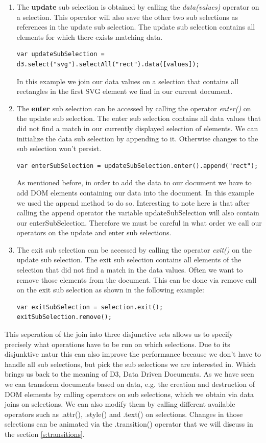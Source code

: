 \documentclass{bioinfo}
\begin{document}
\begin{enumerate}
\item The \textbf{update} sub selection is obtained by calling the \textit{data(values)} operator on a selection. This operator will also save the other two sub selections as references in the update sub selection.
The update sub selection contains all elements for which there exists matching data.
\begin{lstlisting}
var updateSubSelection = d3.select("svg").selectAll("rect").data([values]);
\end{lstlisting}
In this example we join our data values on a selection that contains all rectangles in the first SVG element we find in our current document.

\item The \textbf{enter} sub selection can be accessed by calling the operator \textit{enter()} on the update sub selection.
The enter sub selection contains all data values that did not find a match in our currently displayed selection of elements. We can initialize the data sub selection by appending to it. Otherwise changes to the sub selection won't persist.
\begin{lstlisting}
var enterSubSelection = updateSubSelection.enter().append("rect");
\end{lstlisting}
As mentioned before, in order to add the data to our document we have to add DOM elements containing our data into the document. In this example we used the append method to do so.
Interesting to note here is that after calling the append operator the variable updateSubSelection will also contain our enterSubSelection.
Therefore we must be careful in what order we call our operators on the update and enter sub selections.

\item The exit sub selection can be accessed by calling the operator \textit{exit()} on the update sub selection.
The exit sub selection contains all elements of the selection that did not find a match in the data values.
Often we want to remove those elements from the document. This can be done via remove call on the exit sub selection as shown in the following example:
\begin{lstlisting}
var exitSubSelection = selection.exit();
exitSubSelection.remove();
\end{lstlisting}
\end{enumerate}

This seperation of the join into three disjunctive sets allows us to specify precisely what operations have to be run on which selections. Due to its disjunktive natur this can also improve the performance because we don't have to handle all sub selections, but pick the sub selections we are interested in.
Which brings us back to the meaning of D3, Data Driven Documents.
As we have seen we can transform documents based on data, e.g. the creation and destruction of DOM elements by calling operators on sub selections, which we obtain via data joins on selections.
We can also modify them by calling different available operators such as .attr(), .style() and .text() on selections.
Changes in those selections can be animated via the .transition() operator that we will discuss in the section \ref{s:transitions}.
\end{document}
